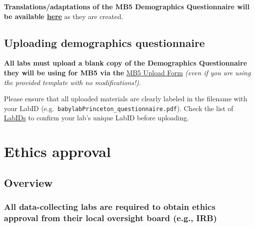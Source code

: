 \documentclass[
  letterpaper,
  DIV=11,
  numbers=noendperiod,
  oneside]{scrreprt}
\begin{document}
\textbf{Translations/adaptations of the MB5 Demographics Questionnaire
will be available \href{MB5\%20Demographics\%20Questionnaire}{here}} as
they are created.

\section{Uploading demographics
questionnaire}\label{uploading-demographics-questionnaire}

\textbf{All labs must upload a blank copy of the Demographics
Questionnaire they will be using for MB5 via the}
\href{https://airtable.com/appRoqMKzcK3NsXt4/pagPm3MXnFExsz1Ti/form}{MB5
Upload Form} \emph{(even if you are using the provided template with no
modifications!)}.

Please ensure that all uploaded materials are clearly labeled in the
filename with your LabID
(e.g.~\texttt{babylabPrinceton\_questionnaire.pdf}). Check the list of
\href{https://manybabies.org/labids/}{LabIDs} to confirm your lab's
unique LabID before uploading.

\chapter{Ethics approval}\label{sec-ethics}

\section{Overview}\label{overview}

\subsection[All data-collecting labs are required to obtain ethics
approval from their local oversight board (e.g.,
IRB)]{\texorpdfstring{All data-collecting labs are required to obtain
ethics approval from their local oversight board (e.g.,
IRB)}{All data-collecting labs are required to obtain ethics approval from their local oversight board (e.g., IRB)}}\label{all-data-collecting-labs-are-required-to-obtain-ethics-approval-from-their-local-oversight-board-e.g.-irb}
\end{document}
